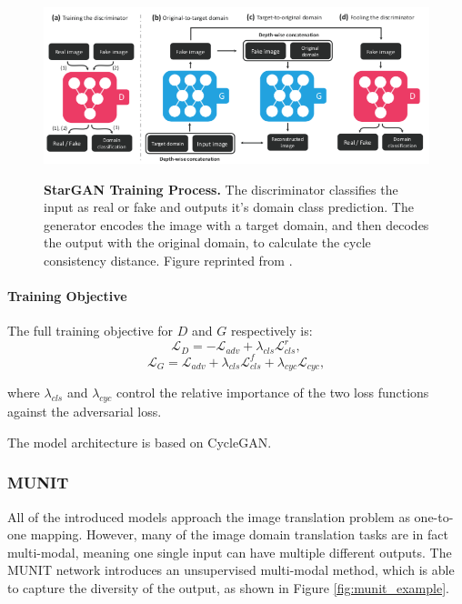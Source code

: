 \documentclass{article}
\begin{document}
\begin{figure}[h]
\centering
{\includegraphics[width=\linewidth]{GAN/stargan}}
\caption{\label{fig:stargan_topo} \textbf{StarGAN Training Process.} The discriminator classifies the input as real or fake and outputs it's domain class prediction. The generator encodes the image with a target domain, and then decodes the output with the original domain, to calculate the cycle consistency distance. Figure reprinted from \cite{choi_stargan_2017}.}
\end{figure}

\paragraph{Training Objective}
The full training objective for $D$ and $G$ respectively is:
\begin{equation}
\mathcal{L}_{D} = -\mathcal{L}_{adv} + \lambda_{cls} \mathcal{L}^{r}_{cls},
\label{eq:stargan_D}
\end{equation}
\begin{equation}
\mathcal{L}_{G} = \mathcal{L}_{adv} + \lambda_{cls} \mathcal{L}^{f}_{cls} + \lambda_{cyc} \mathcal{L}_{cyc},
\label{eq:stargan_G}
\end{equation}

where $\lambda_{cls}$ and $\lambda_{cyc}$ control the relative importance of the two loss functions against the adversarial loss.

The model architecture is based on CycleGAN.


\pagebreak
\subsubsection{MUNIT}

All of the introduced models approach the image translation problem as one-to-one mapping. However, many of the image domain translation tasks are in fact multi-modal, meaning one single input can have multiple different outputs. The MUNIT network \cite{huang_multimodal_2018} introduces an unsupervised multi-modal method, which is able to capture the diversity of the output, as shown in Figure \ref{fig:munit_example}.
\end{document}

